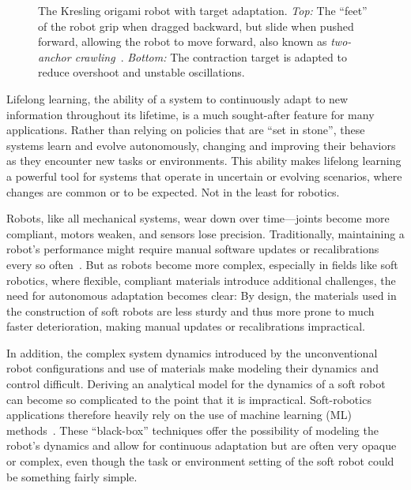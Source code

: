 \begin{figure}[t]
    \centering
    \def\svgwidth{\linewidth}
    \footnotesize\selectfont
    \caption{The Kresling origami robot with target adaptation.
    \emph{Top:} The ``feet'' of the robot grip when dragged backward, but slide when pushed forward, allowing the robot to move forward, also known as \emph{two-anchor crawling}~\parencite{Calisti2017}.
    \emph{Bottom:} The contraction target is adapted to reduce overshoot and unstable oscillations.}
    \label{fig:cool-robot}
\end{figure}

Lifelong learning, the ability of a system to continuously adapt to new information throughout its lifetime, is a much sought-after feature for many applications.
Rather than relying on policies that are ``set in stone'', these systems learn and evolve autonomously, changing and improving their behaviors as they encounter new tasks or environments.
This ability makes lifelong learning a powerful tool for systems that operate in uncertain or evolving scenarios, where changes are common or to be expected.
Not in the least for robotics.

Robots, like all mechanical systems, wear down over time—joints become more compliant, motors weaken, and sensors lose precision.
Traditionally, maintaining a robot’s performance might require manual software updates or recalibrations every so often~\parencite{Lao2023}.
But as robots become more complex, especially in fields like soft robotics, where flexible, compliant materials introduce additional challenges, the need for autonomous adaptation becomes clear:
By design, the materials used in the construction of soft robots are less sturdy and thus more prone to much faster deterioration, making manual updates or recalibrations impractical.

In addition, the complex system dynamics introduced by the unconventional robot configurations and use of materials make modeling their dynamics and control difficult.
Deriving an analytical model for the dynamics of a soft robot can become so complicated to the point that it is impractical.
Soft-robotics applications therefore heavily rely on the use of machine learning (ML) methods~\parencite{Kim2021,Bhagat2019}.
These ``black-box'' techniques offer the possibility of modeling the robot's dynamics and allow for continuous adaptation but are often very opaque or complex, even though the task or environment setting of the soft robot could be something fairly simple.

